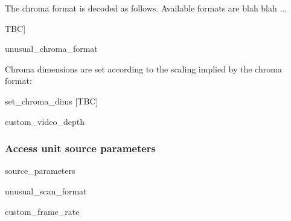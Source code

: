 The chroma format is decoded as follows. Available formats are blah blah ... {TBC]

\begin{pseudo}{unusual\_chroma\_format}{}
\bsIF{\UnusualChromaFormat}
 \bsEND
{}
\end{pseudo}

Chroma dimensions are set according to the scaling implied by the chroma format:

\begin{pseudo}{set\_chroma\_dims}{}
[TBC]
\end{pseudo}



\begin{pseudo}{custom\_video\_depth}{}
\bsIF{\CustomVideoDepth}
 \bsEND
\end{pseudo}



\subsubsection{Access unit source parameters}

\begin{pseudo}{source\_parameters}{}
\end{pseudo}

\begin{pseudo}{unusual\_scan\_format}{}
\bsIF{\UnusualScanFormat}
 \bsIF{\Interlaced}
  \bsIF{\UnusualFieldDominance}
   \bsEND
  \bsIF{\UnusualFieldInterleaving}
   \bsEND
  \bsEND
 \bsEND
\end{pseudo}

\begin{pseudo}{custom\_frame\_rate}{}
\bsIF{\CustomFrameRate}
  \bsEND
 \bsEND
\end{pseudo}

}
